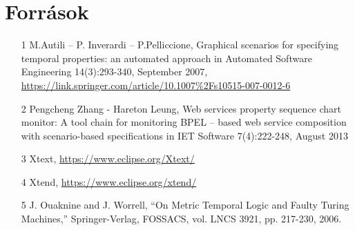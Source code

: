 \chapter{Források}
\begin{itemize}
    \item [1] M.Autili – P. Inverardi – P.Pelliccione, Graphical scenarios for specifying temporal properties: an automated approach in Automated Software Engineering 14(3):293-340, September
2007, \url{https://link.springer.com/article/10.1007%2Fs10515-007-0012-6}
    \item [2] Pengcheng Zhang - Hareton Leung, Web services property sequence chart monitor: A tool chain for monitoring BPEL – based web service composition with scenario-based specifications in IET Software 7(4):222-248, August
2013
    \item [3] Xtext, \url{https://www.eclipse.org/Xtext/}
    \item [4] Xtend, \url{https://www.eclipse.org/xtend/}
    \item [5] J. Ouaknine and J. Worrell, “On Metric Temporal Logic and Faulty Turing Machines,” Springer-Verlag, FOSSACS, vol. LNCS 3921, pp. 217-230, 2006.
\end{itemize}